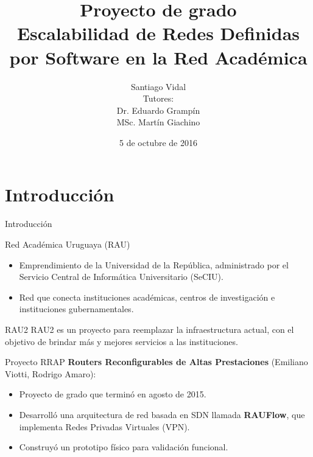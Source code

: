 \documentclass[xcolor=svgnames]{beamer}
\title
	[Escalabilidad de SDN en la RAU]
  {Proyecto de grado \\
  	Escalabilidad de Redes Definidas por Software en la Red Académica}
\author
	[Santiago Vidal]
  {Santiago Vidal \\
  	\vspace{4mm}
  	{\normalfont\small Tutores: \\
  	Dr. Eduardo Grampín \\
  	MSc. Martín Giachino}}
\date
  {5 de octubre de 2016}
\institute
  [UdelaR]
  {Instituto de Computación \\
  	Facultad de Ingeniería \\
  	Universidad de la República}
\begin{document}
\graphicspath{{Figs/}}

\maketitle

\begin{frame}{}
	\tableofcontents
\end{frame}

\section{Introducción}

\begin{frame}
	\tableofcontents[currentsection]
\end{frame}

\begin{frame}{Introducción}
	\begin{block}{Red Académica Uruguaya (RAU)}
		\begin{itemize}
			\item Emprendimiento de la Universidad de la República, administrado por el Servicio Central de Informática Universitario
			(SeCIU).
			\item Red que conecta instituciones académicas, centros de investigación e instituciones gubernamentales.
		\end{itemize}
	\end{block}
	\begin{block}{RAU2}
		RAU2 es un proyecto para reemplazar la infraestructura actual, con el objetivo de brindar más y mejores servicios a las instituciones.
	\end{block}
\end{frame}

\begin{frame}{Proyecto RRAP}
	\textbf{Routers Reconfigurables de Altas Prestaciones} (Emiliano Viotti, Rodrigo Amaro):
	\begin{itemize}
		\item Proyecto de grado que terminó en agosto de 2015.
		\item Desarrolló una arquitectura de red basada en SDN llamada \textbf{RAUFlow}, que implementa Redes Privadas Virtuales (VPN).
		\item Construyó un prototipo físico para validación funcional.
	\end{itemize}
\end{frame}
\end{document}

